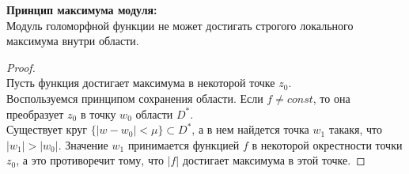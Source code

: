 

\textbf{Принцип максимума модуля:}\\[2mm]
Модуль голоморфной функции не может достигать строгого локального максимума внутри области.\\[2mm]
\begin{proof}
    \ \\
    Пусть функция достигает максимума в некоторой точке $z_0$.\\
    Воспользуемся принципом сохранения области. Если $f\neq const$, то она преобразует $z_0$ в точку $w_0$ области $D^*$. \\
    Существует круг $\{|w-w_0|<\mu\}\subset D^*$, а в нем найдется точка $w_1$ такакя, что  $|w_1|> |w_0|$. Значение $w_1$ принимается функцией $f$ в некоторой окрестности точки $z_0$, а это противоречит тому, что $|f|$ достигает максимума в этой точке.
\end{proof}
